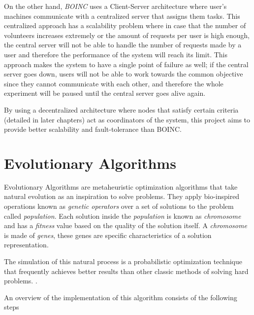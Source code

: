 On the other hand, \textit{BOINC} uses a Client-Server architecture where user's machines communicate with a centralized server that assigns them tasks. This centralized approach has a scalability problem where in case that the number of volunteers increases extremely or the amount of requests per user is high enough, the central server will not be able to handle the number of requests made by a user and therefore the performance of the system will reach its limit. This approach makes the system to have a single point of failure as well; if the central server goes down, users will not be able to work towards the common objective since they cannot communicate with each other, and therefore the whole experiment will be paused until the central server goes alive again.  

By using a decentralized architecture where nodes that satisfy certain criteria (detailed in later chapters) act as coordinators of the system, this project aims to provide better scalability and fault-tolerance than BOINC. 


\section{Evolutionary Algorithms}
Evolutionary Algorithms are metaheuristic optimization algorithms that take natural evolution as an inspiration to solve problems. They apply bio-inspired operations known as \textit{genetic operators} over a set of solutions to the problem called \textit{population}. Each solution inside the \textit{population} is known as \textit{chromosome} and has a \textit{fitness} value based on the quality of the solution itself. A \textit{chromosome} is made of \textit{genes}, these genes are specific characteristics of a solution representation. 
 
The simulation of this natural process is a probabilistic optimization technique that frequently achieves better results than other classic methods of solving hard problems. \cite{galist}. 

An overview of the implementation of this algorithm consists of the following steps

